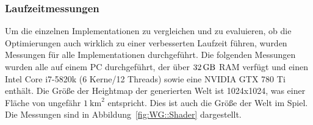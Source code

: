 \subsubsection{Laufzeitmessungen}
Um die einzelnen Implementationen zu vergleichen und zu evaluieren, ob die Optimierungen auch wirklich zu einer verbesserten Laufzeit führen, wurden Messungen für alle Implementationen durchgeführt.
Die folgenden Messungen wurden alle auf einem PC durchgeführt, der über $\SI{32}{\giga\byte}$ RAM verfügt und einen Intel Core i7-5820k (6 Kerne/12 Threads) sowie eine NVIDIA GTX 780 Ti enthält.
Die Größe der Heightmap der generierten Welt ist 1024x1024, was einer Fläche von ungefähr ${\SI{1}{\kilo\meter}}^2$ entspricht.
Dies ist auch die Größe der Welt im Spiel.
Die Messungen sind in Abbildung~\ref{fig:WG::Shader} dargestellt.

